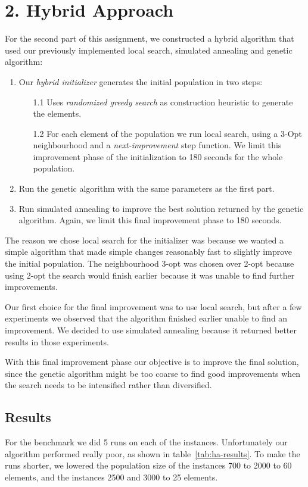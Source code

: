\pagebreak
\section*{2. Hybrid Approach}
For the second part of this assignment, we constructed a hybrid algorithm that used our previously implemented local search, simulated annealing and genetic algorithm:
\begin{enumerate}
	\item Our \textit{hybrid initializer} generates the initial population in two steps:
	\begin{enumerate}
		\item[1.1] Uses \textit{randomized greedy search} as construction heuristic to generate the elements. 
		\item[1.2] For each element of the population we run local search, using a 3-Opt neighbourhood and a \textit{next-improvement} step function. We limit this improvement phase of the initialization to 180 seconds for the whole population.
	\end{enumerate}
	\item Run the genetic algorithm with the same parameters as the first part.
	\item Run simulated annealing to improve the best solution returned by the genetic algorithm. Again, we limit this final improvement phase to 180 seconds.
\end{enumerate}

The reason we chose local search for the initializer was because we wanted a simple algorithm that made simple changes reasonably fast to slightly improve the initial population. The neighbourhood 3-opt was chosen over 2-opt because using 2-opt the search would finish earlier because it was unable to find further improvements.

Our first choice for the final improvement was to use local search, but after a few experiments we observed that the algorithm finished earlier unable to find an improvement. We decided to use simulated annealing because it returned better results in those experiments.

With this final improvement phase our objective is to improve the final solution, since the genetic algorithm might be too coarse to find good improvements when the search needs to be intensified rather than diversified.

\subsection*{Results}
For the benchmark we did 5 runs on each of the instances. Unfortunately our algorithm performed really poor, as shown in table~\ref{tab:ha-results}. To make the runs shorter, we lowered the population size of the instances 700 to 2000 to 60 elements, and the instances 2500 and 3000 to 25 elements.


